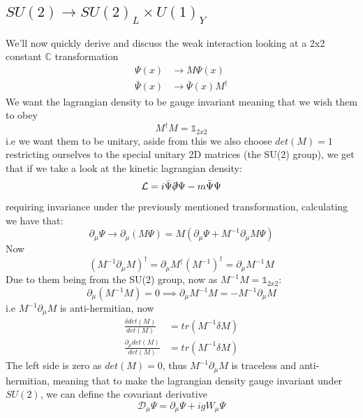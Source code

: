 \documentclass[11pt,a4paper,faculty=we,language=en,doctype=report]{cls/ugent-doc}
\begin{document}
\subsection{$SU(2) \rightarrow SU(2)_L \times U(1)_Y$}
We'll now quickly derive and discuss the weak interaction
looking at a 2x2 constant $\mathbb{C}$ transformation
\begin{align}
	\Psi(x) &\rightarrow M\Psi(x)\\
\bar{\Psi}(x) &\rightarrow \bar{\Psi}(x)M^\dagger
\end{align}
We want the lagrangian density to be gauge invariant meaning that we wish them to obey
\begin{equation}
	M^\dagger M = \mathbb{1}_{2x2}
\end{equation}
i.e we want them to be unitary, aside from this we also choose $det(M)=1$ restricting ourselves to
the special unitary 2D matrices (the SU(2) group), we get that if we take a look at the kinetic lagrangian
density:
\begin{equation}
	\mathcal{L} = i\bar{\Psi}\slashed{\partial}\Psi - m\bar{\Psi}\Psi
\end{equation}
requiring invariance under the previously mentioned transformation, calculating we have that:
\begin{equation}
	\partial_\mu \Psi \rightarrow \partial_\mu(M \Psi) = M(\partial_\mu \Psi + M^{-1}\partial_\mu M \Psi)
\end{equation}
Now
\begin{equation}
	(M^{-1}\partial_\mu M)^\dagger = \partial_\mu M^\dagger (M^{-1})^\dagger = \partial_\mu M^{-1}M
\end{equation}
Due to them being from the SU(2) group, now as $M^{-1}M = \mathbb{1}_{2x2}$:
\begin{equation}
	\partial_\mu (M^{-1}M) = 0 \implies \partial_\mu M^{-1}M = -M^{-1}\partial_\mu M
\end{equation}
i.e $M^{-1}\partial_\mu M$  is anti-hermitian, now 
\begin{align}
	\frac{\delta det(M)}{det(M)} &= tr(M^{-1}\delta M)\\
	\frac{\partial_\mu det(M)}{det(M)} &= tr(M^{-1}\delta M)
\end{align}
The left side is zero as $det(M)=0$, thus $M^{-1}\partial_\mu M$ is traceless and anti-hermitian,
meaning that to make the lagrangian density gauge invariant under $SU(2)$, we can define
the covariant derivative
\begin{equation}
	\mathcal{D}_\mu\Psi = \partial_\mu\Psi + igW_\mu\Psi
\end{equation}
\end{document}
